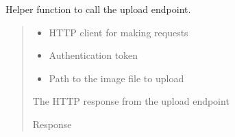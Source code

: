 \documentclass[letterpaper,10pt,openany,oneside,english]{sphinxmanual}
\begin{document}
\begin{savenotes}\begin{fulllineitems}
\label{\detokenize{modules/tests:storeapi.tests.routers.test_upload.call_upload_endpoint}}
\pysigstartsignatures
{}
\pysigstopsignatures
\sphinxAtStartPar
Helper function to call the upload endpoint.
\begin{quote}\begin{description}
\begin{itemize}
\item {} 
\sphinxAtStartPar
{} \textendash{} HTTP client for making requests

\item {} 
\sphinxAtStartPar
{} \textendash{} Authentication token

\item {} 
\sphinxAtStartPar
{} \textendash{} Path to the image file to upload

\end{itemize}

\sphinxAtStartPar
The HTTP response from the upload endpoint

\sphinxAtStartPar
Response

\end{description}\end{quote}

\end{fulllineitems}\end{savenotes}

\end{document}
